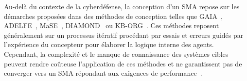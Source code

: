 
Au-delà du contexte de la cyberdéfense, la conception d'un SMA repose sur les démarches proposées dans des méthodes de conception telles que GAIA~\cite{Wooldridge2000,Cernuzzi2014}, ADELFE~\cite{Mefteh2015}, MaSE~\cite{Deloach2001}, DIAMOND~\cite{Jamont2015} ou KB-ORG~\cite{Sims2008}.
Ces méthodes reposent généralement sur un processus itératif procédant par essais et erreurs guidés par l'expérience du concepteur pour élaborer la logique interne des agents. Cependant, la complexité et le manque de connaissance des systèmes cibles peuvent rendre coûteuse l'application de ces méthodes et ne garantissent pas de converger vers un SMA répondant aux exigences de performance~\cite{Mefteh2013}.



